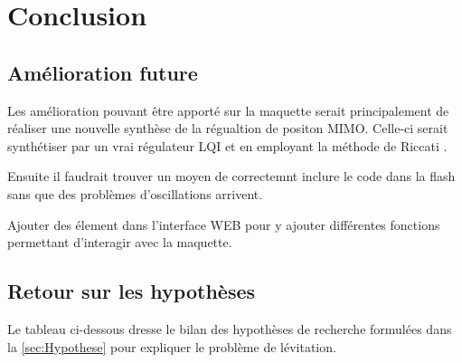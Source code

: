 \chapter{Conclusion}

\section{Amélioration future}
Les amélioration pouvant être apporté sur la maquette serait principalement de réaliser une nouvelle synthèse de la régualtion de positon MIMO. Celle-ci serait synthétiser par un vrai régulateur LQI et en employant la méthode de Riccati \cite{Riccati}.

Ensuite il faudrait trouver un moyen de correctemnt inclure le code dans la flash sans que des problèmes d'oscillations arrivent.

Ajouter des élement dans l'interface WEB pour y ajouter différentes fonctions permettant d'interagir avec la maquette.

\section{Retour sur les hypothèses}
Le tableau ci-dessous dresse le bilan des hypothèses de recherche formulées dans la \autoref{sec:Hypothese} pour expliquer le problème de lévitation.

